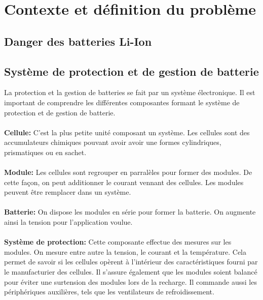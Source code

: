 \section{Contexte et définition du problème}


	\subsection{Danger des batteries Li-Ion}
	
	\subsection{Système de protection et de gestion de batterie}
	
	La protection et la gestion de batteries se fait par un système électronique. Il est important de comprendre les différentes composantes formant le système de protection et de gestion de batterie.
	
		\paragraph{}
		\textbf{Cellule:} C'est la plus petite unité composant un système. Les cellules sont des accumulateurs chimiques pouvant avoir avoir une formes cylindriques, prismatiques ou en sachet.  
		
		\paragraph{}
		\textbf{Module:} Les cellules sont regrouper en parralèles pour former des modules. De cette façon, on peut additionner le courant vennant des cellules. Les modules peuvent être remplacer dans un système.
		
		\paragraph{}
		\textbf{Batterie:} On dispose les modules en série pour former la batterie. On augmente ainsi la tension pour l'application voulue.
		
		\paragraph{}
		\textbf{Système de protection:} Cette composante effectue des mesures sur les modules. On mesure entre autre la tension, le courant et la température. Cela permet de savoir si les cellules opèrent à l'intérieur des caractéristiques fourni par le manufacturier des cellules. Il s'assure également que les modules soient balancé pour éviter une surtension des modules lors de la recharge. Il commande aussi les périphériques auxilières, tels que les ventilateurs de refroidissement.
		

